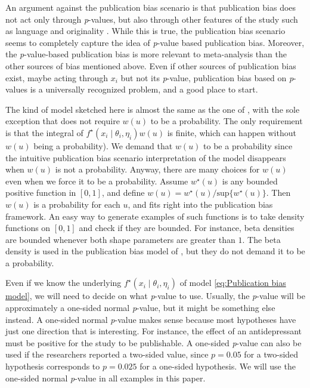 \documentclass{article}
\theoremstyle{plain}
\theoremstyle{definition}
\begin{document}
An argument against the publication bias scenario is that publication bias does not act only through \textit{p}-values, but also through other features of the study such as language \citep{egger1998meta}
and originality \citep{callaham1998positive}. While this is true, the publication bias scenario seems to completely capture the idea of \textit{p}-value based publication bias. Moreover, the \textit{p}-value-based publication bias is more relevant to meta-analysis than the other sources of bias mentioned above. Even if other sources of publication bias exist, maybe acting through $x_{i}$ but not its \textit{p}-value, publication bias based on \textit{p}-values is a universally recognized problem, and a good place to start.

The kind of model sketched here is almost the same as the one of \citet{hedges1992modeling}, with the sole exception that \citet{hedges1992modeling} does not require $w(u)$ to be a probability. The only requirement is that the integral of $f^{\star}(x_{i}\mid\theta_{i},\eta_{i})w(u)$ is finite, which can happen without $w(u)$ being a probability). We demand that $w(u)$ to be a probability since the intuitive publication bias scenario interpretation of the model disappears when $w(u)$ is not a probability. Anyway, there are many choices for $w(u)$ even when we force it to be a probability. Assume $w^{\star}(u)$ is any bounded positive function in $\left[0,1\right]$, and define $w(u)=w^{\star}(u)/\textrm{sup}\{w^{\star}(u)\}$. Then $w(u)$ is a probability for each $u$, and fits right into the publication bias framework. An easy way to generate examples of such functions is to take density functions on $\left[0,1\right]$ and check if they are bounded. For instance, beta densities are bounded whenever both shape parameters are greater than $1$. The beta density is used in the publication bias model of \citet{citkowicz2017parsimonious}, but they do not demand it to be a probability.

Even if we know the underlying $f^{\star}(x_{i}\mid\theta_{i},\eta_{i})$ of model \eqref{eq:Publication bias model}, we will need to decide on what \textit{p}-value to use. Usually, the \textit{p}-value will be approximately a one-sided normal \textit{p}-value, but it might be something
else instead. A one-sided normal \textit{p}-value makes sense because most hypotheses have just one direction that is interesting. For instance, the effect of an antidepressant must be positive for the study to be publishable. A one-sided \textit{p}-value can also be used if the researchers reported a two-sided value, since $p=0.05$ for a two-sided hypothesis corresponds to $p=0.025$ for a one-sided hypothesis. We will use the one-sided normal \textit{p}-value in all examples in this paper.
\end{document}
